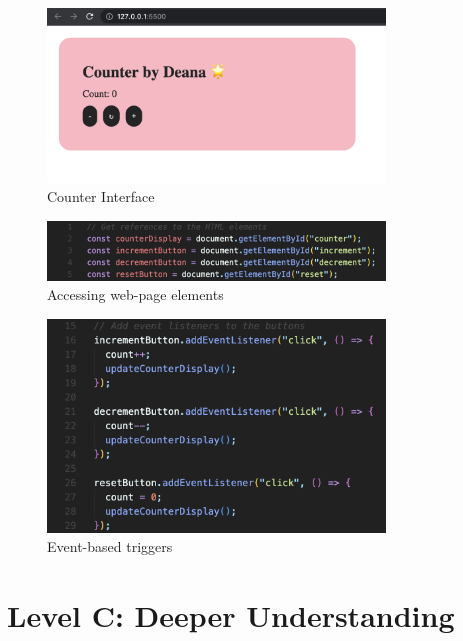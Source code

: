 \documentclass[a4paper, 11pt]{report}
\begin{document}
\begin{figure}[ht]
    \centering
    \includegraphics[width=0.8\textwidth]{Images/counter1.png}
    \caption{Counter Interface}
    \label{fig:screenshot}
\end{figure}

\begin{figure}[ht]
    \centering
    \includegraphics[width=0.8\textwidth]{Images/counter2.png}
    \caption{Accessing web-page elements}
    \label{fig:screenshot}
\end{figure}

\begin{figure}[ht]
    \centering
    \includegraphics[width=0.8\textwidth]{Images/counter3.png}
    \caption{Event-based triggers}
    \label{fig:screenshot}
\end{figure}



\newpage
\section{Level C: Deeper Understanding}
\end{document}
